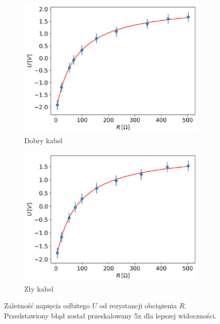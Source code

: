\documentclass[12pt]{article}
\begin{document}
\begin{figure}[H]
  \centering
  \begin{subfigure}{0.45\textwidth}
    \includegraphics[width=\linewidth]{good_cable_voltage}
    \caption{Dobry kabel}
    \label{fig:good_voltage}
  \end{subfigure}\hfill
  \begin{subfigure}{0.45\textwidth}
    \includegraphics[width=\linewidth]{bad_cable_voltage}
    \caption{Zły kabel}
    \label{fig:bad_voltage}
  \end{subfigure}
  \caption{Zależność napięcia odbitego $U$ od rezystancji obciążenia $R$. Przedstawiony błąd został przeskalowany 5x dla lepszej widoczności.}
  \label{fig:voltage_vs_resistance}
\end{figure}
\end{document}
